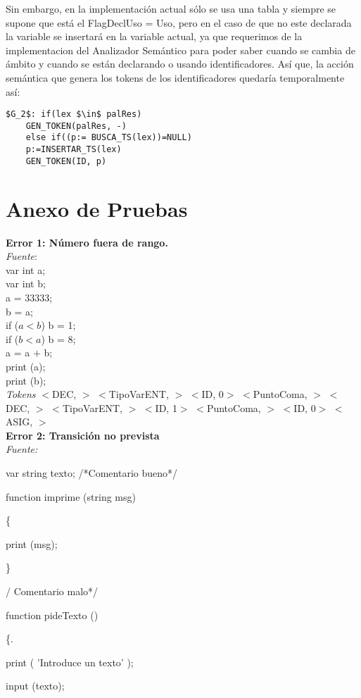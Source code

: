 \documentclass[a4paper, 12pt]{article}
\begin{document}
Sin embargo, en la implementación actual sólo se usa una tabla y siempre se supone que está el FlagDeclUso = Uso, pero en el caso de que no este declarada la variable se insertará en la variable actual, ya que requerimos de la implementacion del Analizador Semántico para poder saber cuando se cambia de ámbito y cuando se están declarando o usando identificadores. Así que, la acción semántica que genera los tokens de los identificadores quedaría temporalmente así:
\begin{lstlisting}
$G_2$: if(lex $\in$ palRes)
	GEN_TOKEN(palRes, -)
    else if((p:= BUSCA_TS(lex))=NULL)
	p:=INSERTAR_TS(lex)
	GEN_TOKEN(ID, p)
\end{lstlisting}

\section{Anexo de Pruebas}

\textbf{Error 1: Número fuera de rango.} \\ 
\emph{Fuente}: \\
var int a; \\
var int b;\\
a = 33333;\\
b = a;\\
 if ($a  <  b$) b  =  1; \\
if ($b  <  a$) b  =  8;\\
 a = a  $+$  b;\\
print (a);\\
print (b);\medskip\\
\emph{Tokens} 
 $<$DEC, $>$ 
 $<$TipoVarENT, $>$ 
 $<$ID, 0$>$ 
 $<$PuntoComa, $>$ 
 $<$DEC, $>$ 
 $<$TipoVarENT, $>$ 
 $<$ID, 1$>$ 
 $<$PuntoComa, $>$ 
 $<$ID, 0$>$ 
 $<$ASIG, $>$ \bigskip \\
\textbf{Error 2: Transición no prevista}\medskip\\
\emph{Fuente:} 


var string texto; /*Comentario bueno*/

 function imprime (string msg)
 
\{

	print (msg);
	
\} 

/ Comentario malo*/

function pideTexto () 

\{. 

	print ( 'Introduce un texto' ); 
	
	input (texto); 
	
\end{document}
